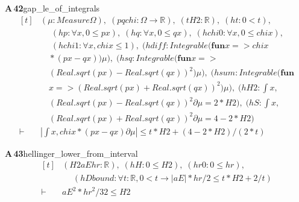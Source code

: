 \documentclass[conference]{IEEEtran}
\theoremstyle{definition}
\newcommand{\lean}[1]{\textsf{\footnotesize #1}}
\begin{document}
\noindent\textbf{A\,42}\quad\lean{gap\_le\_of\_integrals}
{\footnotesize\[ \begin{aligned}[t]
&(\mu : \mathit{Measure} \Omega ),\; (\mathit{p} \mathit{q} \mathit{chi} : \Omega \to \mathbb{R} ),\; (\mathit{t} \mathit{H2} : \mathbb{R} ),\; (\mathit{ht} : 0 < \mathit{t}),\\
&\quad \; (\mathit{hp} : \forall \mathit{x}, 0 \leq \mathit{p} \mathit{x}),\; (\mathit{hq} : \forall \mathit{x}, 0 \leq \mathit{q} \mathit{x}),\; (\mathit{hchi0} : \forall \mathit{x}, 0 \leq \mathit{chi} \mathit{x}),\\
&\quad \; (\mathit{hchi1} : \forall \mathit{x}, \mathit{chi} \mathit{x} \leq 1),\; (\mathit{hdiff} : \mathit{Integrable} (\mathbf{fun} \mathit{x} => \mathit{chi} \mathit{x}\\
&\quad * (\mathit{p} \mathit{x} - \mathit{q} \mathit{x})) \mu ),\; (\mathit{hsq} : \mathit{Integrable} (\mathbf{fun} \mathit{x} =>\\
&\quad (\mathit{Real}.\mathit{sqrt} (\mathit{p} \mathit{x}) - \mathit{Real}.\mathit{sqrt} (\mathit{q} \mathit{x})) ^{2}) \mu ),\; (\mathit{hsum} : \mathit{Integrable} (\mathbf{fun}\\
&\quad \mathit{x} => (\mathit{Real}.\mathit{sqrt} (\mathit{p} \mathit{x}) + \mathit{Real}.\mathit{sqrt} (\mathit{q} \mathit{x})) ^{2}) \mu ),\; (\mathit{hH2} : \int \mathit{x},\\
&\quad (\mathit{Real}.\mathit{sqrt} (\mathit{p} \mathit{x}) - \mathit{Real}.\mathit{sqrt} (\mathit{q} \mathit{x})) ^{2} ∂\mu = 2 * \mathit{H2}),\; (\mathit{hS} : \int \mathit{x},\\
&\quad (\mathit{Real}.\mathit{sqrt} (\mathit{p} \mathit{x}) + \mathit{Real}.\mathit{sqrt} (\mathit{q} \mathit{x})) ^{2} ∂\mu = 4 - 2 * \mathit{H2})\\
\vdash\;&|\int \mathit{x}, \mathit{chi} \mathit{x} * (\mathit{p} \mathit{x} - \mathit{q} \mathit{x}) ∂\mu | \leq \mathit{t} * \mathit{H2} + (4 - 2 * \mathit{H2}) / (2 * \mathit{t})
\end{aligned} \]}

\noindent\textbf{A\,43}\quad\lean{hellinger\_lower\_from\_interval}
{\footnotesize\[ \begin{aligned}[t]
&(\mathit{H2} \mathit{aE} \mathit{hr} : \mathbb{R} ),\; (\mathit{hH} : 0 \leq \mathit{H2}),\; (\mathit{hr0} : 0 \leq \mathit{hr}),\\
&\quad \; (\mathit{hDbound} : \forall \mathit{t} : \mathbb{R} , 0 < \mathit{t} \to |\mathit{aE}| * \mathit{hr} / 2 \leq \mathit{t} * \mathit{H2} + 2 / \mathit{t})\\
\vdash\;&\mathit{aE} ^{2} * \mathit{hr} ^{2} / 32 \leq \mathit{H2}
\end{aligned} \]}
\end{document}
